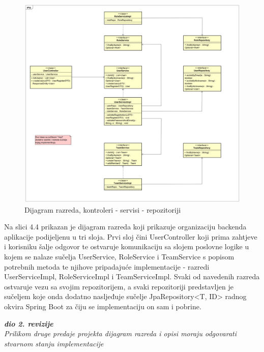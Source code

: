 			\begin{figure}[H]
				\includegraphics[width=\textwidth]{dijagrami/classDiagram2.PNG} 
				\caption{Dijagram razreda, kontroleri - servisi - repozitoriji}
				\label{fig:classDiagram2}
			\end{figure}
		
			Na slici 4.4 prikazan je dijagram razreda koji prikazuje organizaciju backenda aplikacije podijeljenu u tri sloja. Prvi sloj čini UserController koji prima zahtjeve i korisniku šalje odgovor te ostvaruje komunikaciju sa slojem poslovne logike u kojem se nalaze sučelja UserService, RoleService i TeamService s popisom potrebnih metoda te njihove pripadajuće implementacije - razredi UserServiceImpl, RoleServiceImpl i TeamServiceImpl. Svaki od navedenih razreda ostvaruje vezu sa svojim repozitorijem, a svaki repozitoriji predstavljen je sučeljem koje onda dodatno nasljeđuje sučelje JpaRepository\textless T, ID\textgreater{} radnog okvira Spring Boot za čiju se implementaciju on sam i pobrine.
			\newline\newline
		
			\textbf{\textit{dio 2. revizije}}\\			
			
			\textit{Prilikom druge predaje projekta dijagram razreda i opisi moraju odgovarati stvarnom stanju implementacije}
			
			
			
